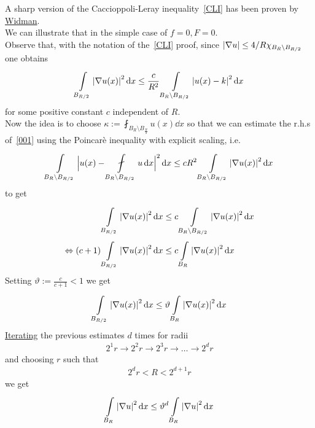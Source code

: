 A sharp version of the Caccioppoli-Leray inequality~\eqref{CLI} has been proven by \underline{Widman}.\\
We can illustrate that in the simple case of \(f=0, F=0\).\\
Observe that, with the notation of the~\eqref{CLI} proof, since \(\abs{\nabla u}\leq \frac{4}{R} \chi_{B_{R}\setminus B_{\frac{R}{2}}}\) one obtains
\begin{gather}
	\int\limits_{B_{\frac{R}{2}}}^{} \abs{\nabla u(x)}^{2} \dd{x} \leq \frac{c}{R^{2}} \int\limits_{B_{R} \setminus B_{\frac{R}{2}}}^{} \abs{u(x)-k}^{2} \dd{x} \label{001}
\end{gather}
for some positive constant \(c\) independent of \(R\).\\
Now the idea is to choose \(\kappa := \fint_{B_{R}\setminus B_{\frac{R}{2}}} u(x) \dd{x}\) so that we can estimate the r.h.s of~\eqref{001} using the Poincarè inequality with explicit scaling, i.e.
\begin{gather}
	\int\limits_{B_{R}\setminus B_{\frac{R}{2}}}^{} \Big\lvert u(x)-\fint\limits_{B_{R}\setminus B_{\frac{R}{2}}}^{} u \dd{x} \Big\rvert^{2} \dd{x} \leq cR^{2}\int\limits_{B_{R}\setminus B_{\frac{R}{2}}}^{} \abs{\nabla u(x)}^{2} \dd{x}
\end{gather}
to get
\begin{align}
	                       & \int\limits_{B_{\frac{R}{2}}}^{} \abs{\nabla u(x)}^{2} \dd{x} \leq c \int\limits_{B_{R}\setminus B_{\frac{R}{2}}}^{} \abs{\nabla u(x)}^{2} \dd{x}  \\
	\Leftrightarrow  (c+1) & \int\limits_{B_{\frac{R}{2}}}^{} \abs{\nabla u(x)}^{2} \dd{x} \leq c \int\limits_{B_{R}}^{} \abs{\nabla u(x)}^{2} \dd{x}
\end{align}
Setting \( \vartheta := \frac{c}{c+1}<1\) we get
\begin{gather}
	\int\limits_{B_{\frac{R}{2}}}^{} \abs{\nabla u(x)}^{2} \dd{x} \leq \vartheta \int\limits_{B_{R}}^{} \abs{\nabla u(x)}^{2} \dd{x}
\end{gather}
\underline{Iterating} the previous estimates \(d\) times for radii
\begin{gather}
	2^{1}r \to 2^{2}r \to 2^{3}r \to \dots \to 2^{d}r
\end{gather}
and choosing \(r\) such that
\begin{gather}
	2^{d}r < R< 2^{d+1}r \label{002}
\end{gather}
we get
\begin{gather}
	\int\limits_{B_{R}}^{} \left\lvert\nabla u\right\rvert^{2} \mathop{}\!\mathrm{d}x \leq \vartheta^{d}\int\limits_{B_{R}}^{} \left\lvert\nabla u\right\rvert^{2} \mathop{}\!\mathrm{d}x
\end{gather}
